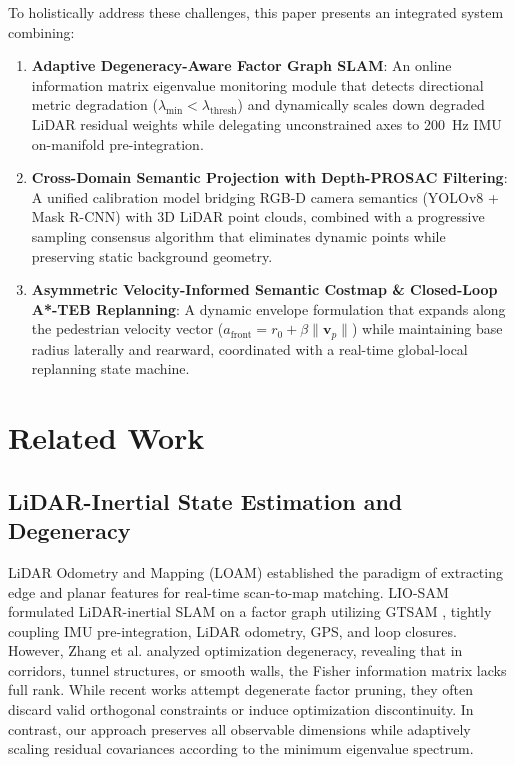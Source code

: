 \documentclass[journal]{IEEEtran}
\begin{document}
To holistically address these challenges, this paper presents an integrated system combining:
\begin{enumerate}
    \item \textbf{Adaptive Degeneracy-Aware Factor Graph SLAM}: An online information matrix eigenvalue monitoring module that detects directional metric degradation ($\lambda_{\min} < \lambda_{\text{thresh}}$) and dynamically scales down degraded LiDAR residual weights while delegating unconstrained axes to 200~Hz IMU on-manifold pre-integration.
    \item \textbf{Cross-Domain Semantic Projection with Depth-PROSAC Filtering}: A unified calibration model bridging RGB-D camera semantics (YOLOv8 + Mask R-CNN) with 3D LiDAR point clouds, combined with a progressive sampling consensus algorithm that eliminates dynamic points while preserving static background geometry.
    \item \textbf{Asymmetric Velocity-Informed Semantic Costmap \& Closed-Loop A*-TEB Replanning}: A dynamic envelope formulation that expands along the pedestrian velocity vector ($a_{\text{front}} = r_0 + \beta \|\mathbf{v}_p\|$) while maintaining base radius laterally and rearward, coordinated with a real-time global-local replanning state machine.
\end{enumerate}

\section{Related Work}

\subsection{LiDAR-Inertial State Estimation and Degeneracy}
LiDAR Odometry and Mapping (LOAM) \cite{zhang2014loam} established the paradigm of extracting edge and planar features for real-time scan-to-map matching. LIO-SAM \cite{shan2020lio} formulated LiDAR-inertial SLAM on a factor graph utilizing GTSAM \cite{dellaert2017factor}, tightly coupling IMU pre-integration, LiDAR odometry, GPS, and loop closures. However, Zhang et al. \cite{zhang2016degeneracy} analyzed optimization degeneracy, revealing that in corridors, tunnel structures, or smooth walls, the Fisher information matrix lacks full rank. While recent works attempt degenerate factor pruning, they often discard valid orthogonal constraints or induce optimization discontinuity. In contrast, our approach preserves all observable dimensions while adaptively scaling residual covariances according to the minimum eigenvalue spectrum.
\end{document}

